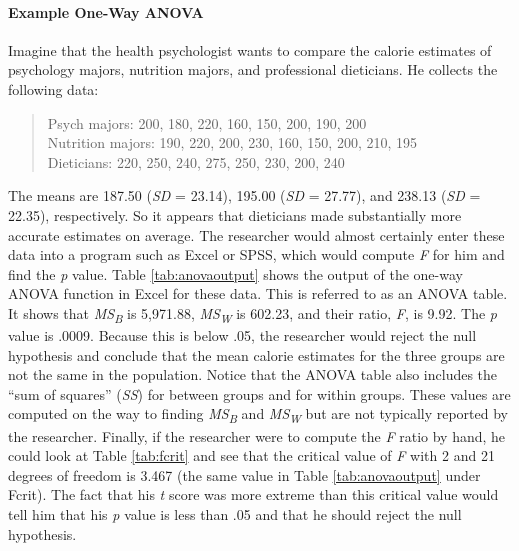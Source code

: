 \documentclass[
]{krantz}
\begin{document}
\paragraph*{Example One-Way ANOVA}\label{example-one-way-anova}

Imagine that the health psychologist wants to compare the calorie estimates of psychology majors, nutrition majors, and professional dieticians. He collects the following data:

\begin{quote}
Psych majors: 200, 180, 220, 160, 150, 200, 190, 200\\
Nutrition majors: 190, 220, 200, 230, 160, 150, 200, 210, 195\\
Dieticians: 220, 250, 240, 275, 250, 230, 200, 240
\end{quote}

The means are 187.50 (\emph{SD} = 23.14), 195.00 (\emph{SD} = 27.77), and 238.13 (\emph{SD} = 22.35), respectively. So it appears that dieticians made substantially more accurate estimates on average. The researcher would almost certainly enter these data into a program such as Excel or SPSS, which would compute \emph{F} for him and find the \emph{p} value. Table \ref{tab:anovaoutput} shows the output of the one-way ANOVA function in Excel for these data. This is referred to as an ANOVA table. It shows that \emph{MS\textsubscript{B}} is 5,971.88, \emph{MS\textsubscript{W}} is 602.23, and their ratio, \emph{F}, is 9.92. The \emph{p} value is .0009. Because this is below .05, the researcher would reject the null hypothesis and conclude that the mean calorie estimates for the three groups are not the same in the population. Notice that the ANOVA table also includes the ``sum of squares'' (\emph{SS}) for between groups and for within groups. These values are computed on the way to finding \emph{MS\textsubscript{B}} and \emph{MS\textsubscript{W}} but are not typically reported by the researcher. Finally, if the researcher were to compute the \emph{F} ratio by hand, he could look at Table \ref{tab:fcrit} and see that the critical value of \emph{F} with 2 and 21 degrees of freedom is 3.467 (the same value in Table \ref{tab:anovaoutput} under Fcrit). The fact that his \emph{t} score was more extreme than this critical value would tell him that his \emph{p} value is less than .05 and that he should reject the null hypothesis.
\end{document}
